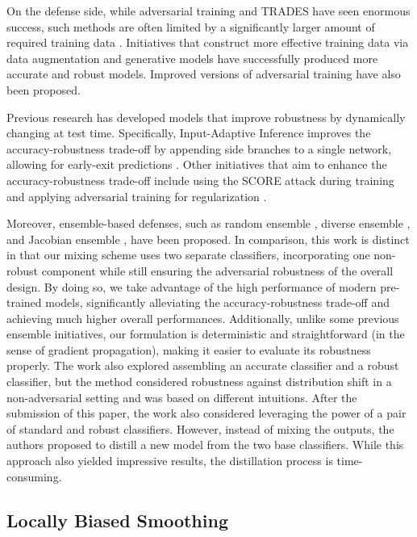 \documentclass[11pt, letterpaper]{article}
\theoremstyle{plain}
\theoremstyle{definition}
\begin{document}
On the defense side, while adversarial training \citep{Madry18} and TRADES \citep{Zhang19} have seen enormous success, such methods are often limited by a significantly larger amount of required training data \citep{Schmidt18}. Initiatives that construct more effective training data via data augmentation \citep{Rebuffi21, Gowal20, Gowal21} and generative models \citep{Sehwag22, Wang23} have successfully produced more accurate and robust models. Improved versions of adversarial training \citep{Jia22, Wang20, Shafahi19, Pagliardini22} have also been proposed.

Previous research has developed models that improve robustness by dynamically changing at test time. Specifically, Input-Adaptive Inference improves the accuracy-robustness trade-off by appending side branches to a single network, allowing for early-exit predictions \citep{Hu20}. Other initiatives that aim to enhance the accuracy-robustness trade-off include using the SCORE attack during training \citep{Pang22} and applying adversarial training for regularization \citep{Zheng21}.

Moreover, ensemble-based defenses, such as random ensemble \citep{Liu18}, diverse ensemble \citep{Pang19, Alam22, Adam20}, and Jacobian ensemble \citep{Co22}, have been proposed. In comparison, this work is distinct in that our mixing scheme uses two separate classifiers, incorporating one non-robust component while still ensuring the adversarial robustness of the overall design. By doing so, we take advantage of the high performance of modern pre-trained models, significantly alleviating the accuracy-robustness trade-off and achieving much higher overall performances. Additionally, unlike some previous ensemble initiatives, our formulation is deterministic and straightforward (in the sense of gradient propagation), making it easier to evaluate its robustness properly. The work \citep{Kumar22} also explored assembling an accurate classifier and a robust classifier, but the method considered robustness against distribution shift in a non-adversarial setting and was based on different intuitions. After the submission of this paper, the work \citep{Zhao23} also considered leveraging the power of a pair of standard and robust classifiers. However, instead of mixing the outputs, the authors proposed to distill a new model from the two base classifiers. While this approach also yielded impressive results, the distillation process is time-consuming.


\subsection{Locally Biased Smoothing} \label{sec:local_biased_smoothing}
\end{document}
